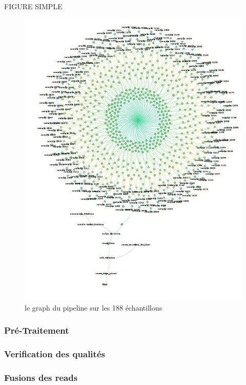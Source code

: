 \documentclass[12pt,a4paper]{article}
\begin{document}
FIGURE SIMPLE

\begin{figure}[ht]
\begin{center}
\includegraphics[scale=0.4]{img/dag.jpg}\hfill
\end{center}
\caption{le graph du pipeline sur les 188 échantillons}
\label{dag}
\end{figure}


\subsubsection{Pré-Traitement}

\subsubsection{Verification des qualités}

\subsubsection{Fusions des reads}
\end{document}
